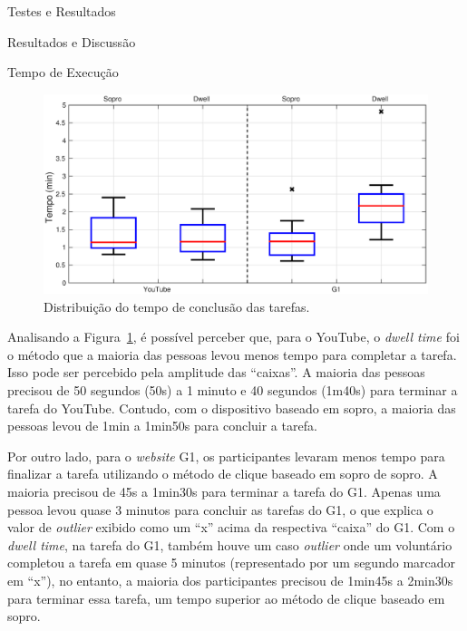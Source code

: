 \begin{chapter}{Testes e Resultados}
\begin{section}{Resultados e Discussão}
\begin{subsection}{Tempo de Execução}
\begin{figure}[!h]
	\centering
	\includegraphics[width=1.0\linewidth]{fig/time}
	\caption{Distribuição do tempo de conclusão das tarefas.}
	\label{fig:tempo}
\end{figure}

Analisando a Figura~\ref{fig:tempo}, é possível perceber que, para o YouTube, o
\textit{dwell time} foi o método que a maioria das pessoas levou menos tempo
para completar a tarefa. Isso pode ser percebido pela amplitude das ``caixas''.
A maioria das pessoas precisou de 50 segundos (50s) a 1 minuto e 40 segundos
(1m40s) para terminar a tarefa do YouTube. Contudo, com o dispositivo baseado em
sopro, a maioria das pessoas levou de 1min a 1min50s para concluir a tarefa.

Por outro lado, para o \textit{website} G1, os participantes levaram menos tempo
para finalizar a tarefa utilizando o método de clique baseado em sopro de sopro.
A maioria precisou de 45s a 1min30s para terminar a tarefa do G1. Apenas uma
pessoa levou quase 3 minutos para concluir as tarefas do G1, o que explica o
valor de \textit{outlier} exibido como um ``x'' acima da respectiva ``caixa'' do
G1. Com o \textit{dwell time}, na tarefa do G1, também houve um caso
\textit{outlier} onde um voluntário completou a tarefa em quase 5 minutos
(representado por um segundo marcador em ``x''), no entanto, a maioria dos
participantes precisou de 1min45s a 2min30s para terminar essa tarefa, um tempo
superior ao método de clique baseado em sopro.


\end{subsection}
\end{section}
\end{chapter}
